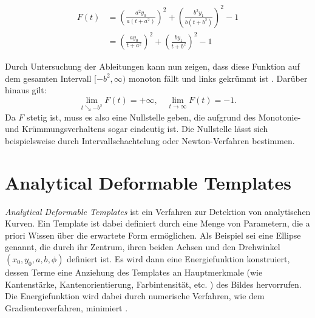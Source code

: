\begin{enumerate}
\[
	\begin{aligned}
		F(t) &= \left(\frac{a^2y_0}{a\left(t+a^2\right)}\right)^2 + \left(\frac{b^2y_1}{b\left(t+b^2\right)}\right)^2 - 1 \\
		&= \left(\frac{ay_0}{t+a^2}\right)^2 + \left(\frac{by_1}{t+b^2}\right)^2 - 1
	\end{aligned}
\]
	
	Durch Untersuchung der Ableitungen kann nun zeigen, dass diese Funktion auf dem gesamten Intervall $[-b^2,\infty)$ monoton fällt und links gekrümmt ist \cite{Eberly2013}. Darüber hinaus gilt:
	\[
	\lim\limits_{t \searrow -b^2}{F(t)}	= +\infty, \quad\lim\limits_{t \rightarrow \infty}{F(t)}	= -1.
	\]
	Da $F$ stetig ist, muss es also eine Nullstelle geben, die aufgrund des Monotonie- und Krümmungsverhaltens sogar eindeutig ist. Die Nullstelle lässt sich beispielsweise durch Intervallschachtelung oder Newton-Verfahren bestimmen. 
\end{enumerate}


\section{Analytical Deformable Templates}
\label{s:anaDef}
\textit{Analytical Deformable Templates} ist ein Verfahren zur Detektion von analytischen Kurven. 
Ein Template ist dabei definiert durch eine Menge von Parametern, die a priori Wissen über die erwartete Form ermöglichen. 
Als Beispiel sei eine  Ellipse genannt, die durch ihr Zentrum, ihren beiden Achsen und den Drehwinkel $(x_0,y_0,a,b,\phi)$ definiert ist.
Es wird dann eine Energiefunktion konstruiert, dessen Terme eine Anziehung des Templates an Hauptmerkmale (wie Kantenstärke, Kantenorientierung, Farbintensität, etc. ) des Bildes hervorrufen. 
Die Energiefunktion wird dabei durch numerische Verfahren, wie dem Gradientenverfahren, minimiert \cite{Yuille1992}. 







